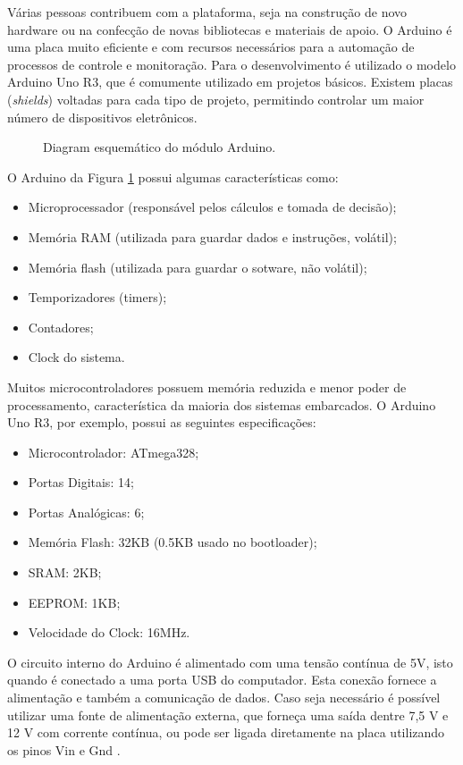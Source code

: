 \documentclass[12pt,report]{uftpibic}
\begin{document}
Várias pessoas contribuem com a plataforma, seja na construção de novo hardware ou na confecção de novas bibliotecas e materiais de apoio. O Arduino é uma placa muito eficiente e com recursos necessários para a automação de processos de controle e monitoração. Para o desenvolvimento é utilizado o modelo Arduino Uno R3, que é comumente utilizado em projetos básicos. Existem placas ({\it shields}) voltadas para cada tipo de projeto, permitindo controlar um maior número de dispositivos eletrônicos.

\begin{figure}[!h]
\centering
\caption{Diagram esquemático do módulo Arduino.}
\label{fig:arduino}
\end{figure}

O Arduino da Figura \ref{fig:arduino} possui algumas características como:

\begin{itemize}
\item Microprocessador (responsável pelos cálculos e tomada de decisão);
\item Memória RAM (utilizada para guardar dados e instruções, volátil);
\item Memória flash (utilizada para guardar o sotware, não volátil);
\item Temporizadores (timers);
\item Contadores;
\item Clock do sistema.
\end{itemize}

Muitos microcontroladores possuem memória reduzida e menor poder de processamento, característica da maioria dos sistemas embarcados. O Arduino Uno R3, por exemplo, possui as seguintes especificações:

\begin{itemize}
\item Microcontrolador: ATmega328;
\item Portas Digitais: 14;
\item Portas Analógicas: 6;
\item Memória Flash: 32KB (0.5KB usado no bootloader);
\item SRAM: 2KB;
\item EEPROM: 1KB;
\item Velocidade do Clock: 16MHz.
\end{itemize}

O circuito interno do Arduino é alimentado com uma tensão contínua de 5V, isto quando é conectado a uma porta USB do computador. Esta conexão fornece a alimentação e também a comunicação de dados. Caso seja necessário é possível utilizar uma fonte de alimentação externa, que forneça uma saída dentre 7,5 V e 12 V com corrente contínua, ou pode ser ligada diretamente na placa utilizando os pinos Vin e Gnd \cite{marcos}.
\end{document}
